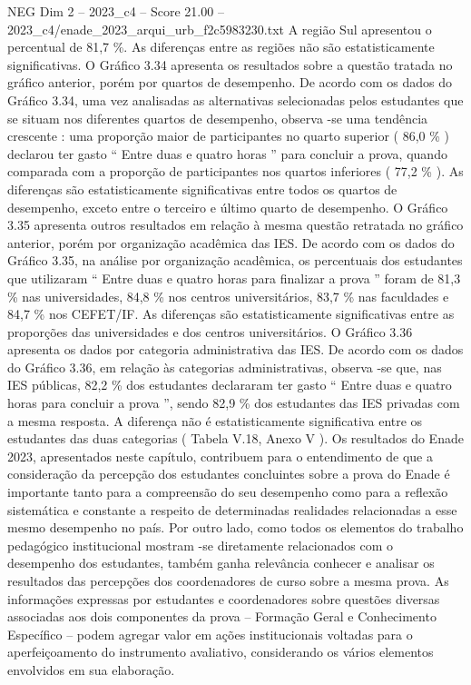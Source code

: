 \begin{textsample}{NEG Dim 2 – 2023\_c4 – Score 21.00 – 2023\_c4/enade\_2023\_arqui\_urb\_f2c5983230.txt}
A região Sul apresentou o percentual de 81,7 \%.
As diferenças entre as regiões não são estatisticamente significativas.
O Gráfico 3.34 apresenta os resultados sobre a questão tratada no gráfico anterior, porém por quartos de desempenho.
De acordo com os dados do Gráfico 3.34, uma vez analisadas as alternativas selecionadas pelos estudantes que se situam nos diferentes quartos de desempenho, observa -se uma tendência crescente : uma proporção maior de participantes no quarto superior ( 86,0 \% ) declarou ter gasto “ Entre duas e quatro horas ” para concluir a prova, quando comparada com a proporção de participantes nos quartos inferiores ( 77,2 \% ).
As diferenças são estatisticamente significativas entre todos os quartos de desempenho, exceto entre o terceiro e último quarto de desempenho.
O Gráfico 3.35 apresenta outros resultados em relação à mesma questão retratada no gráfico anterior, porém por organização acadêmica das IES.
De acordo com os dados do Gráfico 3.35, na análise por organização acadêmica, os percentuais dos estudantes que utilizaram “ Entre duas e quatro horas para finalizar a prova ” foram de 81,3 \% nas universidades, 84,8 \% nos centros universitários, 83,7 \% nas faculdades e 84,7 \% nos CEFET/IF.
As diferenças são estatisticamente significativas entre as proporções das universidades e dos centros universitários.
O Gráfico 3.36 apresenta os dados por categoria administrativa das IES.
De acordo com os dados do Gráfico 3.36, em relação às categorias administrativas, observa -se que, nas IES públicas, 82,2 \% dos estudantes declararam ter gasto “ Entre duas e quatro horas para concluir a prova ”, sendo 82,9 \% dos estudantes das IES privadas com a mesma resposta.
A diferença não é estatisticamente significativa entre os estudantes das duas categorias ( Tabela V.18, Anexo V ).
Os resultados do Enade 2023, apresentados neste capítulo, contribuem para o entendimento de que a consideração da percepção dos estudantes concluintes sobre a prova do Enade é importante tanto para a compreensão do seu desempenho como para a reflexão sistemática e constante a respeito de determinadas realidades relacionadas a esse mesmo desempenho no país.
Por outro lado, como todos os elementos do trabalho pedagógico institucional mostram -se diretamente relacionados com o desempenho dos estudantes, também ganha relevância conhecer e analisar os resultados das percepções dos coordenadores de curso sobre a mesma prova.
As informações expressas por estudantes e coordenadores sobre questões diversas associadas aos dois componentes da prova – Formação Geral e Conhecimento Específico – podem agregar valor em ações institucionais voltadas para o aperfeiçoamento do instrumento avaliativo, considerando os vários elementos envolvidos em sua elaboração.

\end{textsample}
